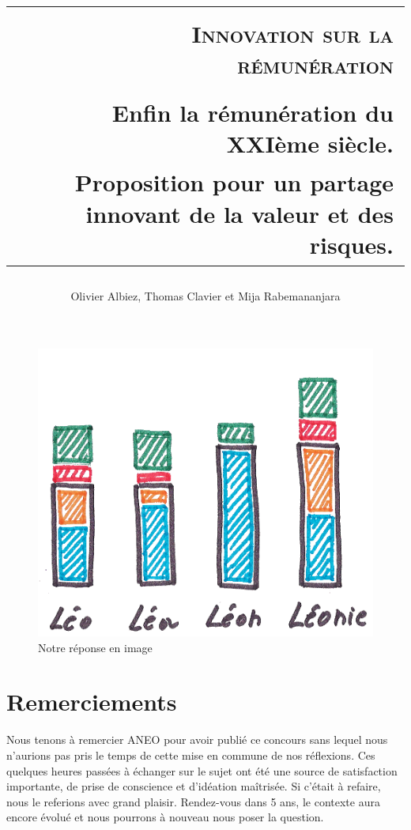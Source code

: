\documentclass[12pt]{article}
\title{
  \begin{tabular}{p{2 cm} r}
    \hline\hline
    & \\
    & \textsc{Innovation sur la rémunération} \\
    & \\
    & \small{Enfin la rémunération du XXIème siècle.}\\
    & \small{Proposition pour un partage innovant de la valeur et des risques.} \\
    \hline\hline
  \end{tabular}
}
\date{}
\author{Olivier Albiez, Thomas Clavier et Mija Rabemananjara}
\begin{document}
\maketitle
\newpage

\tableofcontents
\newpage

\begin{figure}
  \begin{center}
    \includegraphics[width=\textwidth]{includes/remuneration}
  \end{center}
  \caption{Notre réponse en image}
  \label{main}
\end{figure}



\section{Remerciements}

Nous tenons à remercier ANEO pour avoir publié ce concours sans lequel nous n’aurions pas pris le temps de cette mise en commune de nos réflexions. Ces quelques heures passées à échanger sur le sujet ont été une source de satisfaction importante, de prise de conscience et d’idéation maîtrisée. Si c’était à refaire, nous le referions avec grand plaisir. Rendez-vous dans 5 ans, le contexte aura encore évolué et nous pourrons à nouveau nous poser la question. 
\end{document}
